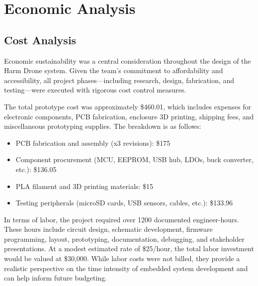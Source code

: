 \documentclass[12pt]{article}
\begin{document}
\section{Economic Analysis}

\subsection{Cost Analysis}

\par Economic sustainability was a central consideration throughout the design of the Harm Drone system. Given the team's commitment to affordability and accessibility, all project phases—including research, design, fabrication, and testing—were executed with rigorous cost control measures.

\par The total prototype cost was approximately \$460.01, which includes expenses for electronic components, PCB fabrication, enclosure 3D printing, shipping fees, and miscellaneous prototyping supplies. The breakdown is as follows:

\begin{itemize}
\item PCB fabrication and assembly (x3 revisions): \$175
\item Component procurement (MCU, EEPROM, USB hub, LDOs, buck converter, etc.): \$136.05
\item PLA filament and 3D printing materials: \$15
\item Testing peripherals (microSD cards, USB sensors, cables, etc.): \$133.96
\end{itemize}

\par In terms of labor, the project required over 1200 documented engineer-hours. These hours include circuit design, schematic development, firmware programming, layout, prototyping, documentation, debugging, and stakeholder presentations. At a modest estimated rate of \$25/hour, the total labor investment would be valued at \$30,000. While labor costs were not billed, they provide a realistic perspective on the time intensity of embedded system development and can help inform future budgeting.
\end{document}
